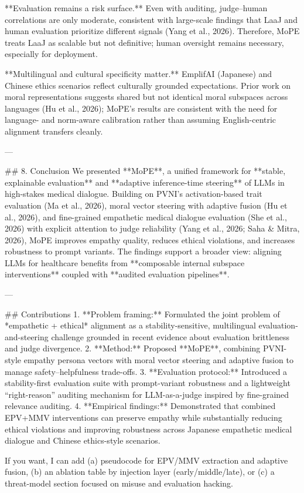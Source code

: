 **Evaluation remains a risk surface.** Even with auditing, judge–human correlations are only moderate, consistent with large-scale findings that LaaJ and human evaluation prioritize different signals (Yang et al., 2026). Therefore, MoPE treats LaaJ as scalable but not definitive; human oversight remains necessary, especially for deployment.

**Multilingual and cultural specificity matter.** EmplifAI (Japanese) and Chinese ethics scenarios reflect culturally grounded expectations. Prior work on moral representations suggests shared but not identical moral subspaces across languages (Hu et al., 2026); MoPE’s results are consistent with the need for language- and norm-aware calibration rather than assuming English-centric alignment transfers cleanly.

---

## 8. Conclusion  
We presented **MoPE**, a unified framework for **stable, explainable evaluation** and **adaptive inference-time steering** of LLMs in high-stakes medical dialogue. Building on PVNI’s activation-based trait evaluation (Ma et al., 2026), moral vector steering with adaptive fusion (Hu et al., 2026), and fine-grained empathetic medical dialogue evaluation (She et al., 2026) with explicit attention to judge reliability (Yang et al., 2026; Saha & Mitra, 2026), MoPE improves empathy quality, reduces ethical violations, and increases robustness to prompt variants. The findings support a broader view: aligning LLMs for healthcare benefits from **composable internal subspace interventions** coupled with **audited evaluation pipelines**.

---

## Contributions  
1. **Problem framing:** Formulated the joint problem of *empathetic + ethical* alignment as a stability-sensitive, multilingual evaluation-and-steering challenge grounded in recent evidence about evaluation brittleness and judge divergence.  
2. **Method:** Proposed **MoPE**, combining PVNI-style empathy persona vectors with moral vector steering and adaptive fusion to manage safety–helpfulness trade-offs.  
3. **Evaluation protocol:** Introduced a stability-first evaluation suite with prompt-variant robustness and a lightweight “right-reason” auditing mechanism for LLM-as-a-judge inspired by fine-grained relevance auditing.  
4. **Empirical findings:** Demonstrated that combined EPV+MMV interventions can preserve empathy while substantially reducing ethical violations and improving robustness across Japanese empathetic medical dialogue and Chinese ethics-style scenarios.

If you want, I can add (a) pseudocode for EPV/MMV extraction and adaptive fusion, (b) an ablation table by injection layer (early/middle/late), or (c) a threat-model section focused on misuse and evaluation hacking.